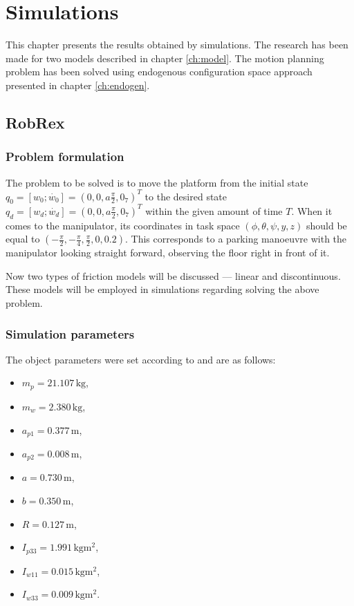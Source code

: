 \chapter{Simulations}
This chapter presents the results obtained by simulations. The research has been made for two models
described in chapter \ref{ch:model}. The motion planning problem has been solved using endogenous
configuration space approach presented in chapter \ref{ch:endogen}.
\section{RobRex}
\subsection{Problem formulation}
The problem to be solved is to move the platform from the initial state
$q_0 = [w_0; \dot{w_0}] = (0, 0, a\frac{\pi}{2}, 0_7)^T$ to the desired state
$q_d = [w_d; \dot{w_d}] = (0, 0, a\frac{\pi}{2}, 0_7)^T$
within the given amount of time $T$. When it comes to the manipulator,
its coordinates in task space $(\phi, \theta, \psi, y, z) $ should be equal to
$(-\frac{\pi}{2}, -\frac{\pi}{4}, \frac{\pi}{2}, 0, 0.2)$.
This corresponds to a parking manoeuvre with the manipulator
looking straight forward, observing the floor right in front of it.

Now two types of friction models will be discussed --- linear
and discontinuous. These models will be employed in simulations
regarding solving the above problem.

\subsection{Simulation parameters}
The object parameters were set according to \cite{coupled} and are as follows:
\begin{multicols}{2}
\begin{itemize}
\item $m_p = 21.107\,\mathrm{kg}$,
\item $m_w = 2.380\,\mathrm{kg}$,
\item $a_{p1} = 0.377\,\mathrm{m}$,
\item $a_{p2} = 0.008\,\mathrm{m}$,
\item $a = 0.730\,\mathrm{m}$,
\item $b = 0.350\,\mathrm{m}$,
\item $R = 0.127\,\mathrm{m}$,
\item $I_{p33} = 1.991\,\mathrm{kgm^2}$,
\item $I_{w11} = 0.015\,\mathrm{kgm^2}$,
\item $I_{w33} = 0.009\,\mathrm{kgm^2}$.
\end{itemize}
\end{multicols}

